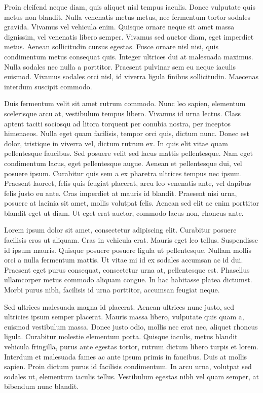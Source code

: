 Proin eleifend neque diam, quis aliquet nisl tempus iaculis. 
Donec vulputate quis metus non blandit. 
Nulla venenatis metus metus, nec fermentum tortor sodales gravida. 
Vivamus vel vehicula enim. 
Quisque ornare neque sit amet massa dignissim, vel venenatis libero semper. 
Vivamus sed auctor diam, eget imperdiet metus. 
Aenean sollicitudin cursus egestas. 
Fusce ornare nisl nisi, quis condimentum metus consequat quis. 
Integer ultrices dui at malesuada maximus. 
Nulla sodales nec nulla a porttitor. 
Praesent pulvinar sem eu neque iaculis euismod. 
Vivamus sodales orci nisl, id viverra ligula finibus sollicitudin. 
Maecenas interdum suscipit commodo.

Duis fermentum velit sit amet rutrum commodo. 
Nunc leo sapien, elementum scelerisque arcu at, vestibulum tempus libero. 
Vivamus id urna lectus. 
Class aptent taciti sociosqu ad litora torquent per conubia nostra, per inceptos himenaeos. 
Nulla eget quam facilisis, tempor orci quis, dictum nunc. 
Donec est dolor, tristique in viverra vel, dictum rutrum ex. 
In quis elit vitae quam pellentesque faucibus. 
Sed posuere velit sed lacus mattis pellentesque. 
Nam eget condimentum lacus, eget pellentesque augue. 
Aenean et pellentesque dui, vel posuere ipsum. 
Curabitur quis sem a ex pharetra ultrices tempus nec ipsum. 
Praesent laoreet, felis quis feugiat placerat, arcu leo venenatis ante, vel dapibus felis justo eu ante. 
Cras imperdiet at mauris id blandit. 
Praesent nisi urna, posuere at lacinia sit amet, mollis volutpat felis. 
Aenean sed elit ac enim porttitor blandit eget ut diam. 
Ut eget erat auctor, commodo lacus non, rhoncus ante.

Lorem ipsum dolor sit amet, consectetur adipiscing elit. 
Curabitur posuere facilisis eros ut aliquam. 
Cras in vehicula erat. 
Mauris eget leo tellus. 
Suspendisse id ipsum mauris. 
Quisque posuere posuere ligula ut pellentesque. 
Nullam mollis orci a nulla fermentum mattis. 
Ut vitae mi id ex sodales accumsan ac id dui. 
Praesent eget purus consequat, consectetur urna at, pellentesque est. 
Phasellus ullamcorper metus commodo aliquam congue. 
In hac habitasse platea dictumst. 
Morbi purus nibh, facilisis id urna porttitor, accumsan feugiat neque.

Sed ultrices malesuada magna id placerat. 
Aenean ultrices nunc justo, sed ultricies ipsum semper placerat. 
Mauris massa libero, vulputate quis quam a, euismod vestibulum massa. 
Donec justo odio, mollis nec erat nec, aliquet rhoncus ligula. 
Curabitur molestie elementum porta. 
Quisque iaculis, metus blandit vehicula fringilla, purus ante egestas tortor, rutrum dictum libero turpis et lorem. 
Interdum et malesuada fames ac ante ipsum primis in faucibus. 
Duis at mollis sapien. 
Proin dictum purus id facilisis condimentum. 
In arcu urna, volutpat sed sodales ut, elementum iaculis tellus. 
Vestibulum egestas nibh vel quam semper, at bibendum nunc blandit.

